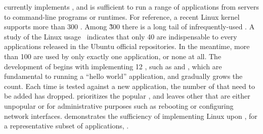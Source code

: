 







\Thelibos{} currently implements \graphenesyscallnum{} \linuxapis{},
and is sufficient to run a range of applications from servers to command-line programs or runtimes.
For reference, a recent Linux kernel supports more than 300 \linuxapis{}.
Among \~300 \linuxapis{}
there is a long tail of infrequently-used \linuxapis{}.
A study of the Linux \linuxapi{} usage~\cite{tsai16apistudy}
indicates that only 40 \linuxapis{} are indispensable to every applications released in the Ubuntu official repositories.
In the meantime, more than 100 \linuxapis{} are used by only exactly one application,
or none at all.
The development of \thelibos{} begins with
implementing 12 \linuxapis{}, such as  and , which are fundamental to running a ``hello world'' application,
and gradually grows the \linuxapi{} count.
Each time \thelibos{} is tested against a new application, the number of \linuxapis{} that need to be added has dropped.
\graphene{} prioritizes the popular \linuxapis{}, and leaves other \linuxapis{} that are either unpopular or for administrative purposes such as rebooting
or configuring network interfaces.
\thelibos{} demonstrates the sufficiency of
implementing Linux \linuxapis{} upon \thehostabi{},
for a representative subset of applications, .


